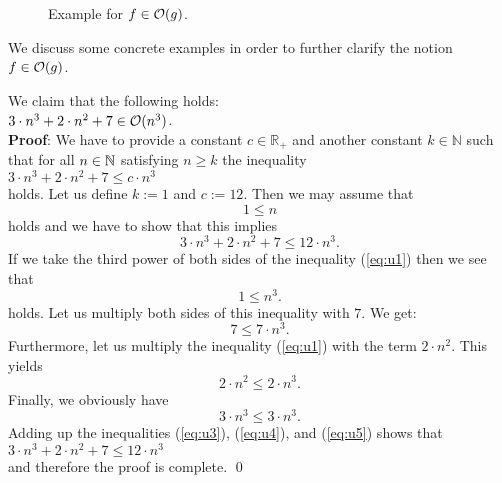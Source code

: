 \begin{figure}[!ht]
  \centering
  \caption{Example for $f \in \mathcal{O}(g)$.}
  \label{fig:big-o.eps}
\end{figure}


\noindent
We discuss some concrete examples in order to further clarify the notion $f \in \mathcal{O}(g)$.

\example
We claim that the following holds:
\\[0.2cm]
\hspace*{1.3cm}
$3 \cdot n^3 + 2 \cdot n^2 + 7 \in \mathcal{O}(n^3)$. 
\\[0.2cm]
\textbf{Proof}:  We have to  provide a constant $c\in\mathbb{R}_+$ and another constant $k\in\mathbb{N}$ such that for all $n\in
{\mathbb N}$ satisfying
$n \geq k$ the inequality
\\[0.2cm]
\hspace*{1.3cm} 
$3 \cdot n^3 + 2 \cdot n^2 + 7 \leq c \cdot n^3$
\\[0.2cm]
holds.  Let us define  $k := 1$ and $c := 12$.  Then we may assume that 
\begin{equation}
  \label{eq:u1}
  1\leq n  
\end{equation}
holds and we have to show that this implies 
\begin{equation}
  \label{eq:u2}
  3 \cdot n^3 + 2 \cdot n^2 + 7 \leq 12 \cdot n^3.
\end{equation}
If we take the third power of both sides of the inequality (\ref{eq:u1}) then we see that
\begin{equation}
  \label{eq:u3pre}
  1 \leq n^3.
\end{equation}
holds.  Let us multiply both sides of this inequality with $7$.  We get: 
\begin{equation}
  \label{eq:u3}
  7 \leq 7 \cdot n^3.
\end{equation}
Furthermore, let us multiply the inequality (\ref{eq:u1}) with the term $2\cdot n^2$.  This yields
\begin{equation}
  \label{eq:u4}
  2 \cdot n^2 \leq 2 \cdot n^3.
\end{equation}
Finally, we obviously have
\begin{equation}
  \label{eq:u5}
  3 \cdot n^3 \leq 3 \cdot n^3.
\end{equation}
Adding up the inequalities (\ref{eq:u3}), (\ref{eq:u4}), and (\ref{eq:u5}) shows that \\[0.2cm]
\hspace*{1.3cm} $3 \cdot n^3 + 2 \cdot n^2 + 7 \leq 12 \cdot n^3$ \\[0.2cm]
and therefore the proof is complete. \qed


